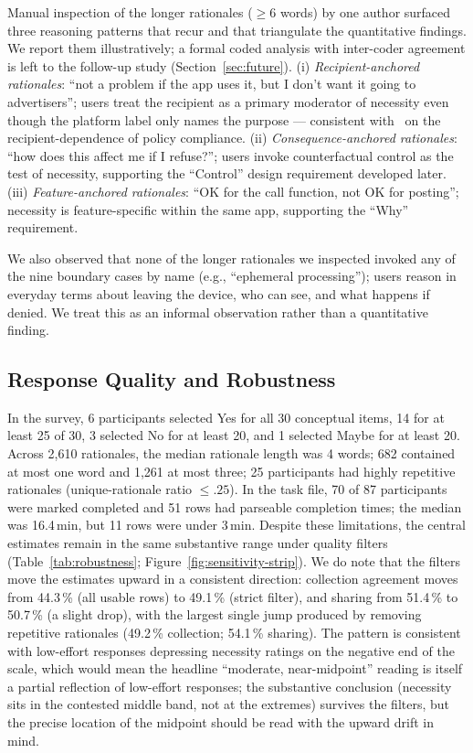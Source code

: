 \documentclass[11pt,a4paper]{article}
\begin{document}
Manual inspection of the longer rationales ($\geq 6$ words) by one
author surfaced three reasoning patterns that recur and that
triangulate the quantitative findings. We report them illustratively;
a formal coded analysis with inter-coder agreement is left to the
follow-up study (Section~\ref{sec:future}). (i) \emph{Recipient-anchored
rationales}: ``not a problem if the app uses it, but I don't want it
going to advertisers''; users treat the recipient as a primary
moderator of necessity even though the platform label only names the
purpose --- consistent
with~\citet{andow:etal:2020,englehardt:narayanan:2016} on the
recipient-dependence of policy compliance. (ii) \emph{Consequence-anchored
rationales}: ``how does this affect me if I refuse?''; users invoke
counterfactual control as the test of necessity, supporting the
``Control'' design requirement developed later. (iii) \emph{Feature-anchored
rationales}: ``OK for the call function, not OK for posting'';
necessity is feature-specific within the same app, supporting the
``Why'' requirement.

We also observed that none of the longer rationales we inspected
invoked any of the nine boundary cases by name (e.g., ``ephemeral
processing''); users reason in everyday terms about leaving the device,
who can see, and what happens if denied. We treat this as an
informal observation rather than a quantitative finding.

\subsection{Response Quality and Robustness}
\label{subsec:quality-robustness}

In the survey, 6 participants selected Yes for all 30 conceptual items,
14 for at least 25 of 30, 3 selected No for at least 20, and 1 selected
Maybe for at least 20. Across 2{,}610 rationales, the median rationale
length was 4 words; 682 contained at most one word and 1{,}261 at most
three; 25 participants had highly repetitive rationales
(unique-rationale ratio $\leq .25$). In the task file, 70 of 87
participants were marked completed and 51 rows had parseable
completion times; the median was 16.4\,min, but 11 rows were under
3\,min. Despite these limitations, the central estimates remain in the
same substantive range under quality filters (Table~\ref{tab:robustness};
Figure~\ref{fig:sensitivity-strip}). We do note that the filters move
the estimates upward in a consistent direction: collection agreement
moves from 44.3\,\% (all usable rows) to 49.1\,\% (strict filter), and
sharing from 51.4\,\% to 50.7\,\% (a slight drop), with the largest
single jump produced by removing repetitive rationales (49.2\,\%
collection; 54.1\,\% sharing). The pattern is consistent with
low-effort responses depressing necessity ratings on the negative end
of the scale, which would mean the headline ``moderate, near-midpoint''
reading is itself a partial reflection of low-effort responses; the
substantive conclusion (necessity sits in the contested middle band,
not at the extremes) survives the filters, but the precise location of
the midpoint should be read with the upward drift in mind.
\end{document}
